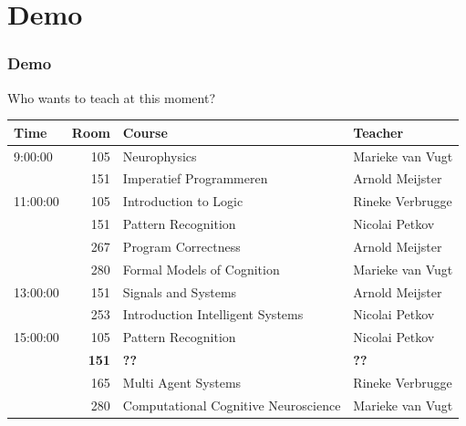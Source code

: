 \documentclass{beamer}
\begin{document}
\section{Demo}
\begin{frame}
	\frametitle{Demo}
	Who wants to teach at this moment?
	\fontsize{6}{7.2}\selectfont
	\begin{table}
		\begin{tabular}{l|r|l|l}
			Time & Room & Course & Teacher \\ \hline
			\hline
			9:00:00 & 105 & Neurophysics & Marieke van Vugt\\
			& 151 & Imperatief Programmeren & Arnold Meijster\\
			\hline
			11:00:00 & 105 & Introduction to Logic & Rineke Verbrugge\\
			& 151 & Pattern Recognition & Nicolai Petkov\\
			& 267 & Program Correctness & Arnold Meijster\\
			& 280 & Formal Models of Cognition & Marieke van Vugt\\ \hline
			13:00:00 & 151 & Signals and Systems & Arnold Meijster\\
			& 253 & Introduction Intelligent Systems & Nicolai Petkov\\\hline
			15:00:00 & 105 & Pattern Recognition & Nicolai Petkov\\
			& \textbf{151} & \textbf{??} & \textbf{??}\\
			& 165 & Multi Agent Systems & Rineke Verbrugge\\
			& 280 & Computational Cognitive Neuroscience & Marieke van Vugt\\
		\end{tabular}
	\end{table}
\end{frame}
\end{document}
